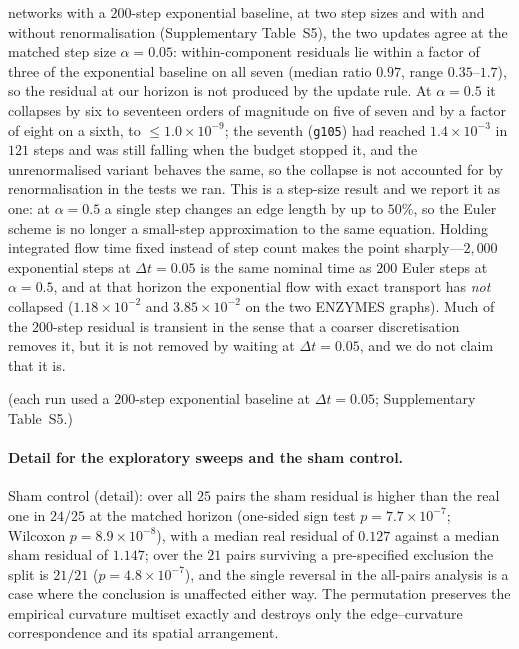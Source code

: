 \documentclass[11pt]{article}
\begin{document}
networks with a $200$-step exponential baseline, at two step sizes and with and
without renormalisation (Supplementary Table~S5), the two updates agree at the
matched step size $\alpha=0.05$: within-component residuals lie within a
factor of three of the exponential baseline on all seven (median ratio
$0.97$, range $0.35$--$1.7$), so the residual at our horizon is not produced
by the update rule. At $\alpha=0.5$ it collapses by six to seventeen orders of
magnitude on five of seven and by a factor of eight on a sixth, to
$\le1.0\times10^{-9}$; the seventh (\texttt{g105}) had reached
$1.4\times10^{-3}$ in $121$ steps and was still falling when the budget
stopped it, and the unrenormalised variant behaves the same, so the collapse
is not accounted for by renormalisation in the tests we ran. This is a step-size result and we
report it as one: at $\alpha=0.5$ a single step changes an edge length by up
to $50\%$, so the Euler scheme is no longer a small-step approximation to the
same equation. Holding integrated flow time fixed instead of step count makes
the point sharply---$2{,}000$ exponential steps at $\Delta t=0.05$ is the same
nominal time as $200$ Euler steps at $\alpha=0.5$, and at that horizon the
exponential flow with exact transport has \emph{not} collapsed
($1.18\times10^{-2}$ and $3.85\times10^{-2}$ on the two ENZYMES graphs). Much
of the $200$-step residual is transient in the sense that a coarser
discretisation removes it, but it is not removed by waiting at
$\Delta t=0.05$, and we do not claim that it is.

(each run used a $200$-step exponential
baseline at $\Delta t=0.05$; Supplementary Table~S5.)

\paragraph{Detail for the exploratory sweeps and the
sham control.} Sham control (detail): over all $25$ pairs the
sham residual is higher than the real one in $24/25$ at the matched horizon
(one-sided sign test $p=7.7\times10^{-7}$; Wilcoxon $p=8.9\times10^{-8}$),
with a median real residual of $0.127$ against a median sham residual of
$1.147$; over the $21$ pairs surviving a pre-specified exclusion the split is
$21/21$ ($p=4.8\times10^{-7}$), and the single reversal in the all-pairs
analysis is a case where the conclusion is unaffected either way. The
permutation preserves the empirical curvature multiset exactly and destroys
only the edge--curvature correspondence and its spatial arrangement.
\end{document}
